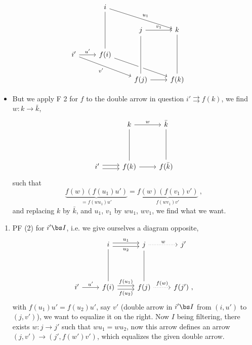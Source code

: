 
\[
\begin{tikzcd}
{} & i \arrow[drr, "u_1"] \arrow[dd, dash] & {} & {} \\
{} & {} & j \arrow[r, "v_1"] & k \arrow[dd, dash] \\
i' \arrow[r, "u'"] \arrow[drr, "v'"'] & f(i) \arrow[drr] & {} & {} \\
{} & {} & f(j) \arrow[r] \arrow[uu, dash, crossing over] & f(k)
\end{tikzcd}
\]

\begin{itemize}[label={}]
\item {}But we apply F 2 for $f$ to the double arrow in question $i' \rightrightarrows f(k)$, we find $w : k \longrightarrow \bar{k}$,
\[
\begin{tikzcd}
{} & k \arrow[r, "w"] \arrow[dd, dash] & \bar{k} \arrow[dd, dash] \\
{} & {} & {} \\
i' \arrow[r, shift left] \arrow[r, shift right] & f(k) \arrow[r] & f(\bar{k})
\end{tikzcd}
\]
such that
\[
\underbrace{f(w)(f(u_1)u')}_{= f(wu_1)u'} = \underbrace{f(w)(f(v_1)v')}_{f(wv_1)v'} \ ,
\]
and replacing $k$ by $\bar{k}$, and $u_1$, $v_1$ by $wu_1$, $wv_1$, we find what we want.
\end{itemize}

\begin{enumerate}[label=\arabic*), start=2]
\item PF (2) for $i'\bs I$, i.e. we give ourselves a diagram opposite,
\[
\begin{tikzcd}
{} & i \arrow[r, shift left, "u_1"] \arrow[r, shift right, "u_2"'] \arrow[dd, dash] & j \arrow[r, dotted, "w"] \arrow[dd, dash] & j' \\
{} & {} & {} & {} \\
i' \arrow[r, "u'"] & f(i) \arrow[r, shift left, "f(u_1)"] \arrow[r, shift right, "f(u_2)"'] & f(j) \arrow[r, dotted, "f(w)"] & f(j') \ ,
\end{tikzcd}
\]
with $f(u_1)u' = f(u_2)u'$, say $v'$ (double arrow in $i'\bs I$ from $(i,u')$ to $(j,v')$), we want to equalize it on the right. Now $I$ being filtering, there exists $w : j \longrightarrow j'$ such that $wu_1 = wu_2$, now this arrow defines an arrow $(j,v') \longrightarrow (j', f(w')v')$, which equalizes the given double arrow. %
\end{enumerate}

